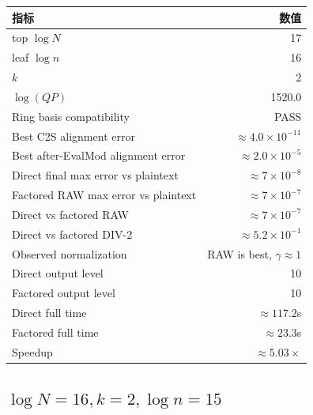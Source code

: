 \documentclass[UTF8,11pt,a4paper]{ctexart}
\begin{document}
\begin{center}
\begin{tabular}{lr}
\toprule
指标 & 数值 \\
\midrule
top $\log N$ & 17 \\
leaf $\log n$ & 16 \\
$k$ & 2 \\
$\log(QP)$ & 1520.0 \\
Ring basis compatibility & PASS \\
Best C2S alignment error & $\approx 4.0\times 10^{-11}$ \\
Best after-EvalMod alignment error & $\approx 2.0\times 10^{-5}$ \\
Direct final max error vs plaintext & $\approx 7\times 10^{-8}$ \\
Factored RAW max error vs plaintext & $\approx 7\times 10^{-7}$ \\
Direct vs factored RAW & $\approx 7\times 10^{-7}$ \\
Direct vs factored DIV-2 & $\approx 5.2\times 10^{-1}$ \\
Observed normalization & RAW is best, $\gamma\approx 1$ \\
Direct output level & 10 \\
Factored output level & 10 \\
Direct full time & $\approx 117.2$s \\
Factored full time & $\approx 23.3$s \\
Speedup & $\approx 5.03\times$ \\
\bottomrule
\end{tabular}
\end{center}

\subsection{$\log N=16,k=2,\log n=15$}
\end{document}
